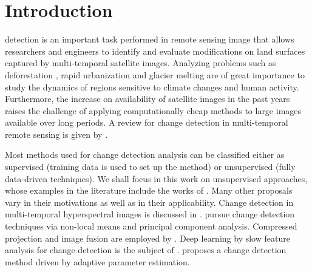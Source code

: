 \documentclass[journal]{IEEEtran}
\begin{document}
%
\IEEEpeerreviewmaketitle



\section{Introduction}
% 
% 
% 
% 

 detection is an important task performed in remote sensing image that allows researchers and engineers to identify and evaluate modifications on land surfaces captured by multi-temporal satellite images. Analyzing problems such as deforestation \cite{barreto2016deforestation}, rapid urbanization \cite{ban2012multitemporal} and glacier melting \cite{scher2021mapping} are of great importance to study the dynamics of regions sensitive to climate changes and human activity. Furthermore, the increase on availability of satellite images in the past years raises the challenge of applying computationally cheap methods to large images available over long periods. A review for change detection in multi-temporal remote sensing is given by \cite{ban2016change}.


Most methods used for change detection analysis can be classified either as supervised (training data is used to set up the method) or unsupervised (fully data-driven techniques). We shall focus in this work on unsupervised approaches, whose examples in the literature include the works of \cite{bruzzone2000automatic,celik2010change,quin2014mimosa,saha2020change,NegriEA2021,NegriFrery2021}. Many other proposals vary in their motivations as well as in their applicability.  Change detection in multi-temporal hyperspectral images is discussed in \cite{bovolo2015time,liu2019review,matsunaga2017current}.  \cite{jia2018novel} pursue change detection techniques via non-local means and principal component analysis. Compressed projection and image fusion are employed by \cite{hou2014unsupervised}. Deep learning by slow feature analysis for change detection is the subject of \cite{du2019unsupervised}. \cite{chen2020change} proposes a change detection method driven by adaptive parameter estimation.
\end{document}
